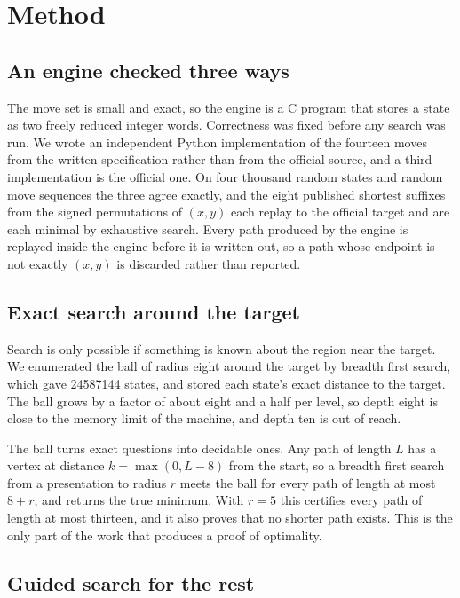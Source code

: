 \documentclass[11pt]{article}
\newcommand{\nBallStates}{24587144}
\begin{document}
\section{Method}

\subsection{An engine checked three ways}

The move set is small and exact, so the engine is a C program that stores a state as two freely reduced integer words. Correctness was fixed before any search was run. We wrote an independent Python implementation of the fourteen moves from the written specification rather than from the official source, and a third implementation is the official one. On four thousand random states and random move sequences the three agree exactly, and the eight published shortest suffixes from the signed permutations of $(x,y)$ each replay to the official target and are each minimal by exhaustive search. Every path produced by the engine is replayed inside the engine before it is written out, so a path whose endpoint is not exactly $(x,y)$ is discarded rather than reported.

\subsection{Exact search around the target}

Search is only possible if something is known about the region near the target. We enumerated the ball of radius eight around the target by breadth first search, which gave \nBallStates{} states, and stored each state's exact distance to the target. The ball grows by a factor of about eight and a half per level, so depth eight is close to the memory limit of the machine, and depth ten is out of reach.

The ball turns exact questions into decidable ones. Any path of length $L$ has a vertex at distance $k=\max(0,L-8)$ from the start, so a breadth first search from a presentation to radius $r$ meets the ball for every path of length at most $8+r$, and returns the true minimum. With $r=5$ this certifies every path of length at most thirteen, and it also proves that no shorter path exists. This is the only part of the work that produces a proof of optimality.

\subsection{Guided search for the rest}
\end{document}
